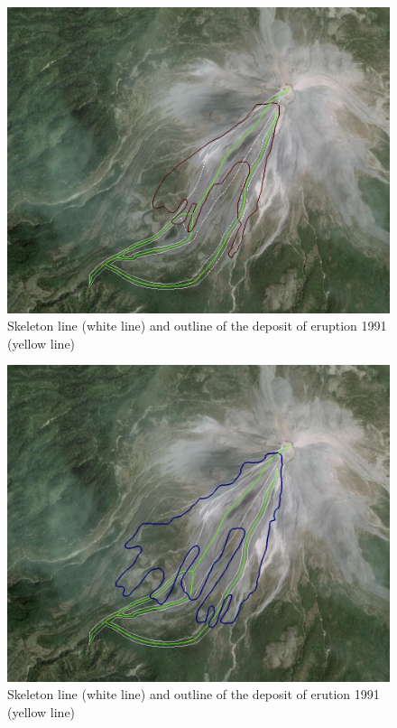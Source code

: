 \documentclass[letterpaper,10pt]{article}
\begin{document}
\begin{figure}[H]
\centerline{\includegraphics[width=\textwidth]{IMAGES/levelset1.jpg}}
\caption{Skeleton line (white line) and outline of the deposit of eruption 1991 (yellow line)}
\label{level_colima}
\end{figure}
 
 \begin{figure}[H]
 \centerline{\includegraphics[scale=0.5]{IMAGES/tiny1.jpg}}
 \caption{Skeleton line (white line) and outline of the deposit of erution 1991 (yellow line)}
 \label{compfig}
 \end{figure}
 
\end{document}
